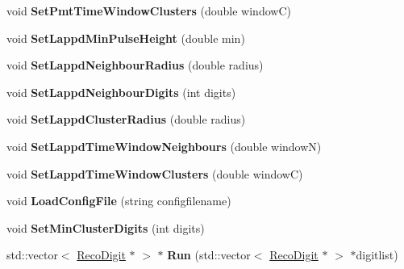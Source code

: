 \begin{DoxyCompactItemize}
\item 
\hypertarget{classHitCleaner_a5d427dd83732333d8918993e2c5a08d2}{
void {\bfseries SetPmtTimeWindowClusters} (double windowC)}
\label{classHitCleaner_a5d427dd83732333d8918993e2c5a08d2}

\item 
\hypertarget{classHitCleaner_abe7877bee548ff2e72db4991ebe8d9b1}{
void {\bfseries SetLappdMinPulseHeight} (double min)}
\label{classHitCleaner_abe7877bee548ff2e72db4991ebe8d9b1}

\item 
\hypertarget{classHitCleaner_a3deef1a55f3597115b7a1514c23ab2b4}{
void {\bfseries SetLappdNeighbourRadius} (double radius)}
\label{classHitCleaner_a3deef1a55f3597115b7a1514c23ab2b4}

\item 
\hypertarget{classHitCleaner_af872da7d231440f4fa75b2dfe6be5fc8}{
void {\bfseries SetLappdNeighbourDigits} (int digits)}
\label{classHitCleaner_af872da7d231440f4fa75b2dfe6be5fc8}

\item 
\hypertarget{classHitCleaner_aacf88b73ee3bb0bb4afa4648c64add65}{
void {\bfseries SetLappdClusterRadius} (double radius)}
\label{classHitCleaner_aacf88b73ee3bb0bb4afa4648c64add65}

\item 
\hypertarget{classHitCleaner_aaa0aca2da3c1a4670e9a4a1361e9b124}{
void {\bfseries SetLappdTimeWindowNeighbours} (double windowN)}
\label{classHitCleaner_aaa0aca2da3c1a4670e9a4a1361e9b124}

\item 
\hypertarget{classHitCleaner_a093989b06deb5743b6c4c81092e69ceb}{
void {\bfseries SetLappdTimeWindowClusters} (double windowC)}
\label{classHitCleaner_a093989b06deb5743b6c4c81092e69ceb}

\item 
\hypertarget{classHitCleaner_a6f25436f395cb868857f7a4b5c418de2}{
void {\bfseries LoadConfigFile} (string configfilename)}
\label{classHitCleaner_a6f25436f395cb868857f7a4b5c418de2}

\item 
\hypertarget{classHitCleaner_a1154c24324e11dc8d0d53bcd806d7113}{
void {\bfseries SetMinClusterDigits} (int digits)}
\label{classHitCleaner_a1154c24324e11dc8d0d53bcd806d7113}

\item 
\hypertarget{classHitCleaner_ae47191a46b30d5345b1e1c422767f816}{
std::vector$<$ \hyperlink{classRecoDigit}{RecoDigit} $\ast$ $>$ $\ast$ {\bfseries Run} (std::vector$<$ \hyperlink{classRecoDigit}{RecoDigit} $\ast$ $>$ $\ast$digitlist)}
\label{classHitCleaner_ae47191a46b30d5345b1e1c422767f816}


\end{DoxyCompactItemize}
